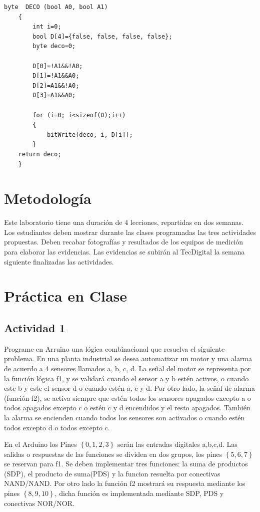 \begin{lstlisting}[language=Arduino,numbers=none, showstringspaces=false]
	byte  DECO (bool A0, bool A1)
	{
		int i=0;
		bool D[4]={false, false, false, false};
		byte deco=0;
	
		D[0]=!A1&&!A0;
		D[1]=!A1&&A0;
		D[2]=A1&&!A0;
		D[3]=A1&&A0;
	
		for (i=0; i<sizeof(D);i++)
		{
			bitWrite(deco, i, D[i]);
		}
	return deco;
	}
\end{lstlisting}
  
\section{Metodología}

Este laboratorio tiene una duración de 4 lecciones, repartidas en dos semanas. Los estudiantes deben mostrar durante las clases programadas las tres actividades propuestas. Deben recabar fotografías y resultados de los equipos de medición para elaborar las evidencias. Las evidencias se subirán al TecDigital la semana siguiente finalizadas las actividades.

\section{Práctica en Clase}

\subsection{Actividad 1}

Programe en Arruino una lógica combinacional que resuelva el siguiente problema.  En una planta industrial se desea automatizar un motor y una alarma de acuerdo a 4 sensores llamados a, b, c, d.  La señal del motor se representa por la función lógica f1, y se validará  cuando el sensor  a y b estén activos, o cuando  este b y  este el sensor d o cuando estén a, c y d. Por otro lado, la señal de  alarma (función f2), se activa siempre que estén todos los sensores apagados excepto a o todos apagados excepto c o  estén c y d encendidos y el resto apagados. También la alarma se encienden cuando todos los sensores son activados o cuando estén todos excepto d o todos excepto c.
 
 En el Arduino los Pines $\left\lbrace 0,1,2,3\right\rbrace $ serán las entradas digitales {a,b,c,d}. Las salidas o respuestas de las funciones se dividen en dos grupos, los pines $\left\lbrace 5,6,7\right\rbrace $ se reservan para f1. Se deben implementar tres funciones:  la suma de productos (SDP), el producto de suma(PDS) y la funcion resuelta por conectivas NAND/NAND.   Por otro lado la función f2  mostrar\'{a} su respuesta mediante los pines 
 $\left\lbrace 8,9,10\right\rbrace $, dicha función es implementada mediante SDP, PDS y conectivas NOR/NOR.
 
